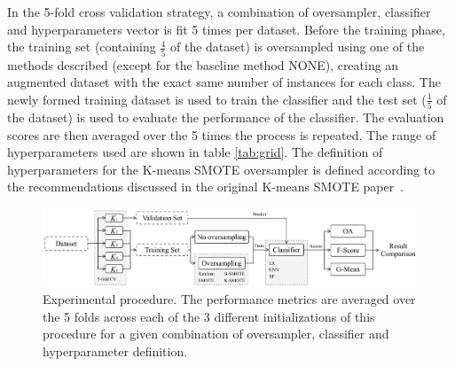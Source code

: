 \documentclass[information,article,submit,moreauthors,pdftex]{Definitions/mdpi}
\begin{document}
\begin{paracol}{2}
In the 5-fold cross validation strategy, a combination
of oversampler, classifier and hyperparameters vector is fit 5 times
per dataset. Before the training
phase, the training set
(containing $\frac{4}{5}$ of the dataset) is oversampled using one of the methods
described (except for the baseline method NONE), creating an augmented
dataset with the exact same number of instances for
each class. The newly formed training dataset is used to train the classifier
and the test set ($\frac{1}{5}$ of the dataset)
is used to evaluate the performance of the classifier. The evaluation scores
are then averaged over the 5 times the process is repeated. The range of
hyperparameters used are shown in table \ref{tab:grid}. The definition of
hyperparameters for the K-means SMOTE oversampler is defined according to the
recommendations discussed in the original K-means SMOTE
paper~\citep{Douzas2018}.

\end{paracol}
\begin{figure}
	\centering
    \captionsetup{justification=centering}
    \caption{Experimental procedure. The performance metrics are averaged over
    the 5 folds across each of the 3 different initializations of this
    procedure for a given combination of oversampler, classifier and
    hyperparameter definition.
    \vspace{.25cm}}\label{fig:experiment_pipeline}
	\includegraphics[width=1\linewidth]{../analysis/experiment_pipeline}
\end{figure}
\begin{paracol}{2}
\linenumbers
\switchcolumn

\end{paracol}
\end{document}
